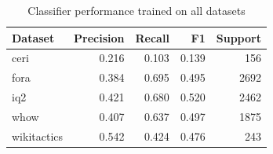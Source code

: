 \begin{table}[t]
\caption{Classifier performance trained on all datasets}
\label{tab:metrics}
\begin{tabular}{lrrrr}
\toprule
Dataset & Precision & Recall & F1 & Support \\
\midrule
ceri & 0.216 & 0.103 & 0.139 & 156 \\
fora & 0.384 & 0.695 & 0.495 & 2692 \\
iq2 & 0.421 & 0.680 & 0.520 & 2462 \\
whow & 0.407 & 0.637 & 0.497 & 1875 \\
wikitactics & 0.542 & 0.424 & 0.476 & 243 \\
\bottomrule
\end{tabular}
\end{table}
